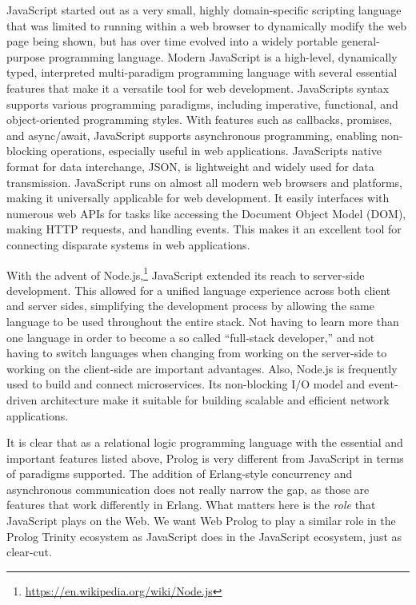 JavaScript started out as a very small, highly domain-specific scripting language that was limited to running within a web browser to dynamically modify the web page being shown, but has over time evolved into a widely portable general-purpose programming language. Modern JavaScript is a high-level, dynamically typed, interpreted multi-paradigm programming language with several essential features that make it a versatile tool for web development. JavaScript\textquotesingle s syntax supports various programming paradigms, including imperative, functional, and object-oriented programming styles. With features such as callbacks, promises, and async/await, JavaScript supports asynchronous programming, enabling non-blocking operations, especially useful in web applications. JavaScript\textquotesingle s native format for data interchange, JSON, is lightweight and widely used for data transmission. JavaScript runs on almost all modern web browsers and platforms, making it universally applicable for web development. It easily interfaces with numerous web APIs for tasks like accessing the Document Object Model (DOM), making HTTP requests, and handling events. This makes it an excellent tool for connecting disparate systems in web applications.

With the advent of Node.js,\footnote{\url{https://en.wikipedia.org/wiki/Node.js}} JavaScript extended its reach to server-side development. This allowed for a unified language experience across both client and server sides, simplifying the development process by allowing the same language to be used throughout the entire stack. Not having to learn more than one language in order to become a so called ``full-stack developer,'' and not having to switch languages when changing from working on the server-side to working on the client-side are important advantages. Also, Node.js is frequently used to build and connect microservices. Its non-blocking I/O model and event-driven architecture make it suitable for building scalable and efficient network applications.

It is clear that as a relational logic programming language with the essential and important features listed above, Prolog is very different from JavaScript in terms of paradigms supported. The addition of Erlang-style concurrency and asynchronous communication does not really narrow the gap, as those are features that work differently in Erlang. What matters here is the \textit{role} that JavaScript plays on the Web. We want Web Prolog to play a similar role in the Prolog Trinity ecosystem as JavaScript does in the JavaScript ecosystem, just as clear-cut.

